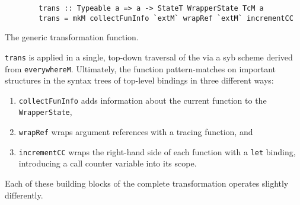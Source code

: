 \documentclass[thesis=B,english]{FITthesis}[2019/12/23]
\newcommand{\hsType}[1]{\texttt{#1}}
\newcommand{\hsIdent}[1]{\texttt{#1}}
\newcommand{\hsCode}[1]{\texttt{#1}}
\begin{document}
\begin{listing}[h]
	\centering
	\begin{verbatim}
        trans :: Typeable a => a -> StateT WrapperState TcM a
        trans = mkM collectFunInfo `extM` wrapRef `extM` incrementCC
	\end{verbatim}
	\caption{The generic transformation function.}
	\label{lst:hs-trans}
\end{listing}

\hsIdent{trans} is applied in a single, top-down traversal of the
 via a \acrshort{syb} scheme derived from \hsIdent{everywhereM}.
Ultimately, the function pattern-matches on important structures in the syntax
trees of top-level bindings in three different ways:
\begin{enumerate}
	\item \hsIdent{collectFunInfo} adds information about the current function
		to the \hsType{WrapperState},
	\item \hsIdent{wrapRef} wraps argument references with a tracing function, and
	\item \hsIdent{incrementCC} wraps the right-hand side of each function with
		a \hsCode{let} binding, introducing a call counter variable into
		its scope.
\end{enumerate}

Each of these building blocks of the complete transformation operates slightly
differently.
\end{document}
